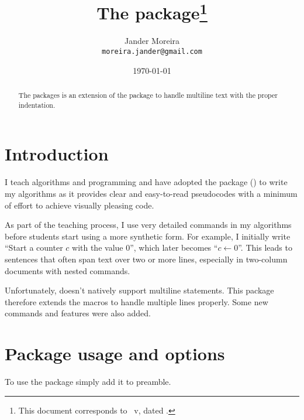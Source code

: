 \documentclass[a4paper, 11pt]{article}
\title{The \PackageName{algxpar} package\thanks{This document corresponds to \PackageName{algxpar}~v\AlgVersion, dated \AlgDate.}}
\author{Jander Moreira\\\texttt{moreira.jander@gmail.com}}
\date{\today}
\begin{document}
\maketitle
\sloppy

\begin{abstract}
    The  packages is an extension of the  package to handle multiline text with the proper indentation.
\end{abstract}

\tableofcontents

\vspace{2em}



\section{Introduction}
I teach algorithms and programming and have adopted the  package () to write my algorithms as it provides clear and easy-to-read pseudocodes with a minimum of effort to achieve visually pleasing code.

As part of the teaching process, I use very detailed commands in my algorithms before students start using a more synthetic form. For example, I initially write ``Start a counter $c$ with the value $0$'', which later becomes ``${c \gets 0}$''. This leads to sentences that often span text over two or more lines, especially in two-column documents with nested commands.

Unfortunately,  doesn't natively support multiline statements. This package therefore extends the macros to handle multiple lines properly. Some new commands and features were also added.




\section{Package usage and options}
To use the package simply add it to preamble.
\end{document}
